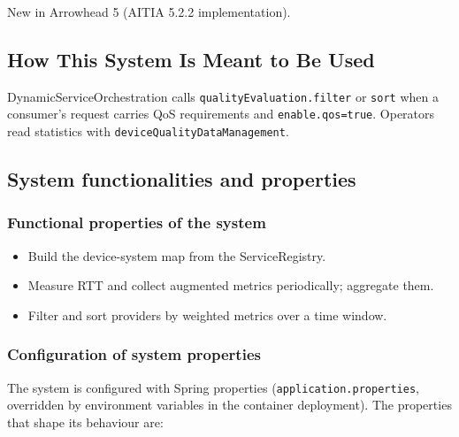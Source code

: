 \documentclass[a4paper]{arrowhead}
\begin{document}
New in Arrowhead 5 (AITIA 5.2.2 implementation).

\subsection{How This System Is Meant to Be Used}
\label{sec:use}

Dynamic\allowbreak{}Service\allowbreak{}Orchestration calls \texttt{quality\allowbreak{}Evaluation.\allowbreak{}filter} or \texttt{sort} when a consumer's request carries QoS requirements and \texttt{enable.\allowbreak{}qos=\allowbreak{}true}. Operators read statistics with \texttt{device\allowbreak{}Quality\allowbreak{}Data\allowbreak{}Management}.

\subsection{System functionalities and properties}
\label{sec:properties}

\subsubsection{Functional properties of the system}

\begin{itemize}
  \item Build the device-system map from the ServiceRegistry.
  \item Measure RTT and collect augmented metrics periodically; aggregate them.
  \item Filter and sort providers by weighted metrics over a time window.
\end{itemize}

\subsubsection{Configuration of system properties}

The system is configured with Spring properties (\texttt{application.properties}, overridden by environment variables in the container deployment). The properties that shape its behaviour are:
\end{document}
